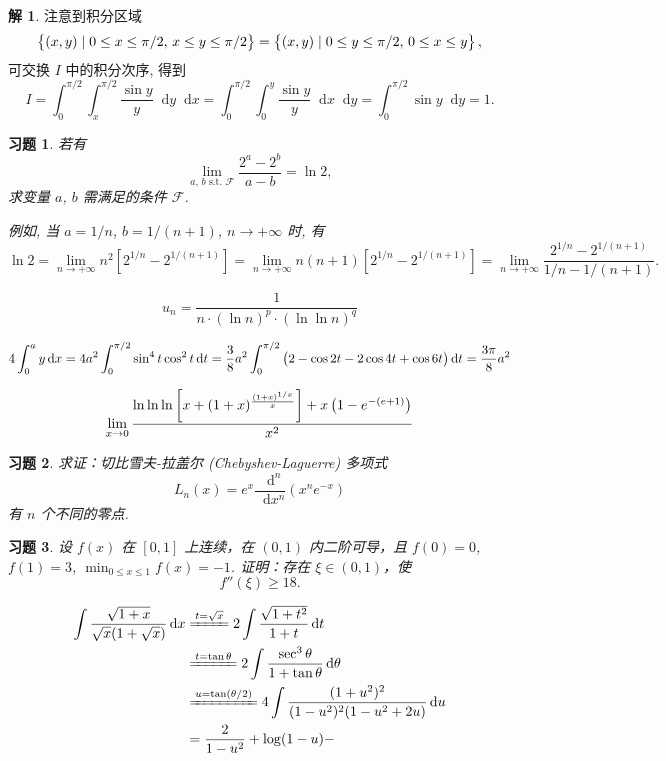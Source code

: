\documentclass{ctexart}
\renewcommand\dif{\mathop{}\!\mathrm{d}}
\newcommand{\dx}{\ensuremath{\dif x}}
\newcommand{\dt}{\ensuremath{\dif t}}
\theoremstyle{plain}
\newtheorem{exercise}{习题}[subsection]
\theoremstyle{definition}
\newtheorem*{solution}{解}
\begin{document}
\begin{solution}
    注意到积分区域
    \[
    \set[1]{ (x, y) \mid 0 \le x \le \pi/2,\, x \le y \le \pi / 2 }
    = \set[1]{ (x, y) \mid 0 \le y \le \pi/2,\, 0 \le x \le y },
    \]
    可交换 $I$ 中的积分次序, 得到
    \[
    I 
    = \int_0^{\pi / 2} \int_x^{\pi / 2} \frac{\sin y}{y} \dif y \dx
    = \int_0^{\pi / 2} \int_0^y \frac{\sin y}{y} \dx \dif y
    = \int_0^{\pi / 2} \sin y \dif y
    = 1.
    \]
\end{solution}

\begin{exercise}
    若有 
    \[
    \lim_{a,\,b\text{ s.t. }\mathcal{F}}\frac{2^a-2^b}{a-b} = \ln 2,
    \]
    求变量 $a$, $b$ 需满足的条件 $\mathcal{F}$.
    
    例如, 当 $a=1/n$, $b=1/(n+1)$, $n\to +\infty$ 时, 有
    \[
    \ln 2
    = \lim_{n\to +\infty} n^2 [2^{1/n}-2^{1/(n+1)}]
    = \lim_{n\to +\infty} n(n+1) [2^{1/n}-2^{1/(n+1)}]
    = \lim_{n\to +\infty} \frac{2^{1/n}-2^{1/(n+1)}}{1/n - 1/(n+1)}.
    \]
\end{exercise}

\[
u_n = \frac{1}{n \cdot (\ln n)^p \cdot (\ln\ln n)^q}
\]

\[
4\int_0^a y \dx = 4a^2\int_0^{\pi/2} \sin^4 t \cos^2 t \dif t = \frac 38 a^2 \int_0^{\pi/2}\del[1]{2-\cos 2t - 2\cos 4t + \cos 6t}\dif t = \frac{3\pi}{8} a^2
\]

\[
\lim_{x \to 0} \frac{\ln \ln \ln \sbr[3]{x + (1 + x)^{\frac{(1 + x)^{1/x}}{x}}} + x \del[1]{1 - e^{-(e + 1)}}}{x^2}
\]


\begin{exercise}
    求证：切比雪夫-拉盖尔 (Chebyshev-Laguerre) 多项式
    \[
        L_n(x) = e^x \frac{\dif^n}{\dif x^n} (x^n e^{-x})
    \]
    有 $n$ 个不同的零点.
\end{exercise}





\begin{exercise}
    设 $f(x)$ 在 $[0, 1]$ 上连续，在 $(0, 1)$ 内二阶可导，且 $f(0) = 0$, $f(1) = 3$, $\min_{0 \le x \le 1} f(x) = -1$. 证明：存在 $\xi \in (0, 1)$，使
    \[
        f''(\xi) \ge 18.
    \]
\end{exercise}

\begin{align*}
    \int \frac{\sqrt{1 + x}}{\sqrt{x} (1 + \sqrt{x})} \dx
    &\xlongequal{t = \sqrt{x}} 2\int \frac{\sqrt{1 + t^2}}{1 + t} \dt \\
    &\xlongequal{t = \tan \theta} 2\int \frac{\sec^3 \theta}{1 + \tan \theta} \dif \theta \\
    &\xlongequal{u = \tan(\theta/2)} 4\int \frac{(1 + u^2)^2}{(1 - u^2)^2 (1 - u^2 + 2u)} \dif u \\
    &= \frac{2}{1 - u^2} + \log(1 - u) - 
\end{align*}
\end{document}
